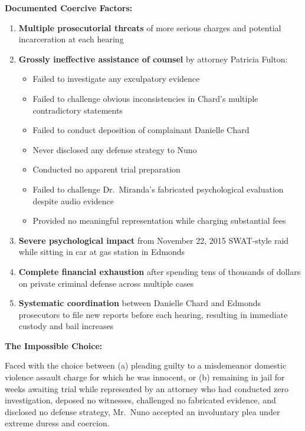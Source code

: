 \documentclass[11pt, letterpaper]{article}
\begin{document}
\textbf{Documented Coercive Factors:}
\begin{enumerate}[leftmargin=*,itemsep=2pt]
    \item \textbf{Multiple prosecutorial threats} of more serious charges and potential incarceration at each hearing
    \item \textbf{Grossly ineffective assistance of counsel} by attorney Patricia Fulton:
    \begin{itemize}[leftmargin=*,itemsep=1pt]
        \item Failed to investigate any exculpatory evidence
        \item Failed to challenge obvious inconsistencies in Chard's multiple contradictory statements
        \item Failed to conduct deposition of complainant Danielle Chard
        \item Never disclosed any defense strategy to Nuno
        \item Conducted no apparent trial preparation
        \item Failed to challenge Dr.\ Miranda's fabricated psychological evaluation despite audio evidence
        \item Provided no meaningful representation while charging substantial fees
    \end{itemize}
    \item \textbf{Severe psychological impact} from November 22, 2015 SWAT-style raid while sitting in car at gas station in Edmonds
    \item \textbf{Complete financial exhaustion} after spending tens of thousands of dollars on private criminal defense across multiple cases
    \item \textbf{Systematic coordination} between Danielle Chard and Edmonds prosecutors to file new reports before each hearing, resulting in immediate custody and bail increases
\end{enumerate}

\textbf{The Impossible Choice:}

Faced with the choice between (a) pleading guilty to a misdemeanor domestic violence assault charge for which he was innocent, or (b) remaining in jail for weeks awaiting trial while represented by an attorney who had conducted zero investigation, deposed no witnesses, challenged no fabricated evidence, and disclosed no defense strategy, Mr.\ Nuno accepted an involuntary plea under extreme duress and coercion.
\end{document}
